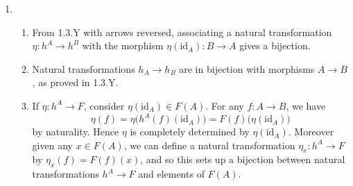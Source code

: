 \documentclass{report}
\newcommand{\id}{{\mathrm{id}}} %
\begin{document}
\begin{enumerate}[label=\textbf{1.3.\Alph*.}]
	\item
	      \begin{enumerate}[label=(\alph*)]
		      \item From 1.3.Y with arrows reversed, associating a natural
		            transformation $\eta:h^A\to h^B$ with the morphism
		            $\eta(\id_A):B\to A$ gives a bijection.

		      \item Natural transformations $h_A\to h_B$ are in bijection with
		            morphisms $A\to B$, as proved in 1.3.Y.

		      \item If $\eta:h^A\to F$, consider $\eta(\id_A)\in F(A)$. For any
		            $f:A\to B$, we have
		            \begin{equation*}
			            \eta(f)
			            = \eta\bigl(h^A(f)(\id_A)\bigr)
			            = F(f)\bigl(\eta(\id_A)\bigr)
		            \end{equation*}
		            by naturality. Hence $\eta$ is completely determined by
		            $\eta(\id_A)$. Moreover given any $x\in F(A)$, we can define
		            a natural transformation $\eta_x:h^A\to F$ by $\eta_x(f)=F(f)(x)$,
		            and so this sets up a bijection between natural transformations
		            $h^A\to F$ and elements of $F(A)$.
	      \end{enumerate}
\end{enumerate}
\end{document}
